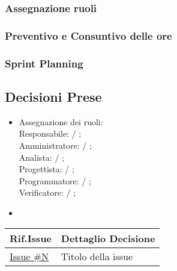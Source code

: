 \documentclass[10pt]{article}
\begin{document}
\subsubsection{Assegnazione ruoli}

\subsubsection{Preventivo e Consuntivo delle ore}

\subsubsection{Sprint Planning}


\subsection{Decisioni Prese}
    \begin{itemize}
        \item   Assegnazione dei ruoli:\\
                Responsabile: / ;\\
                Amministratore: / ;\\
                Analista: / ;\\
                Progettista: / ;\\
                Programmatore: / ;\\
                Verificatore: / ;\\
        \item 
    \end{itemize}
    
    \begin{center}
    \begin{tabular}{|>{\centering\arraybackslash}m{3cm}|>{\centering\arraybackslash}m{12cm}|}
	\hline
	\textbf{Rif.Issue} & \textbf{Dettaglio Decisione}\\
	\hline
            \href{}{Issue \#N} & Titolo della issue\\
        \hline
    \end{tabular}
    \end{center}
\end{document}
